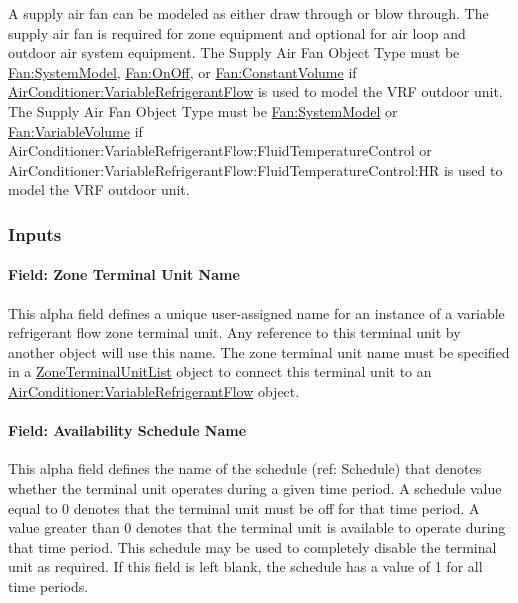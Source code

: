 A supply air fan can be modeled as either draw through or blow through. The supply air fan is required for zone equipment and optional for air loop and outdoor air system equipment. The Supply Air Fan Object Type must be \hyperref[fansystemmodel]{Fan:SystemModel}, \hyperref[fanonoff]{Fan:OnOff}, or \hyperref[fanconstantvolume]{Fan:ConstantVolume} if \hyperref[airconditionervariablerefrigerantflow]{AirConditioner:VariableRefrigerantFlow} is used to model the VRF outdoor unit. The Supply Air Fan Object Type must be \hyperref[fansystemmodel]{Fan:SystemModel} or \hyperref[fanvariablevolume]{Fan:VariableVolume} if AirConditioner:VariableRefrigerantFlow:\-FluidTemperatureControl or AirConditioner:VariableRefrigerantFlow:\-FluidTemperatureControl:HR is used to model the VRF outdoor unit.

\subsubsection{Inputs}\label{inputs-14-018}

\paragraph{Field: Zone Terminal Unit Name}\label{field-zone-terminal-unit-name}

This alpha field defines a unique user-assigned name for an instance of a variable refrigerant flow zone terminal unit. Any reference to this terminal unit by another object will use this name. The zone terminal unit name must be specified in a \hyperref[zoneterminalunitlist]{ZoneTerminalUnitList} object to connect this terminal unit to an \hyperref[airconditionervariablerefrigerantflow]{AirConditioner:VariableRefrigerantFlow} object.

\paragraph{Field: Availability Schedule Name}\label{field-availability-schedule-name-13-001}

This alpha field defines the name of the schedule (ref: Schedule) that denotes whether the terminal unit operates during a given time period. A schedule value equal to 0 denotes that the terminal unit must be off for that time period. A value greater than 0 denotes that the terminal unit is available to operate during that time period. This schedule may be used to completely disable the terminal unit as required. If this field is left blank, the schedule has a value of 1 for all time periods.


